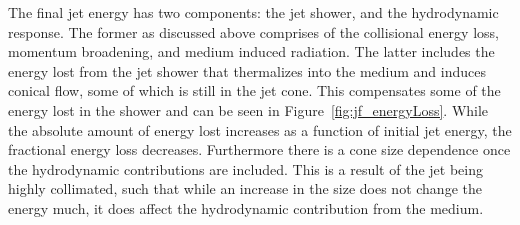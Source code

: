 The final jet energy has two components: the jet shower, and the hydrodynamic response.
The former as discussed above comprises of the collisional energy loss, momentum broadening, and medium induced radiation.
The latter includes the energy lost from the jet shower that thermalizes into the medium and induces conical flow, some of which is still in the jet cone.
This compensates some of the energy lost in the shower and can be seen in Figure~\ref{fig:jf_energyLoss}.
While the absolute amount of energy lost increases as a function of initial jet energy, the fractional energy loss decreases.
Furthermore there is a cone size dependence once the hydrodynamic contributions are included.
This is a result of the jet being highly collimated, such that while an increase in the size does not change the energy much, it does affect the hydrodynamic contribution from the medium.


